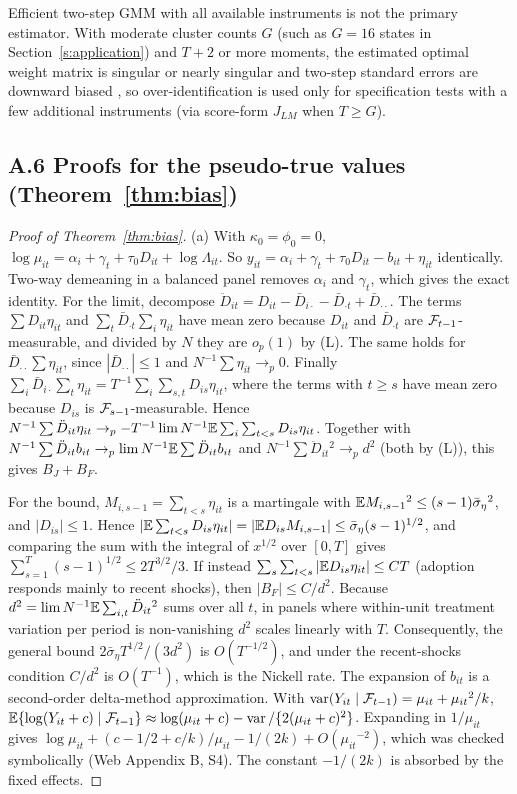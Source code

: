 Efficient two-step GMM with all available instruments is not the primary estimator. With
moderate cluster counts $G$ (such as $G=16$ states in Section~\ref{s:application}) and $T+2$ or more
moments, the estimated optimal weight matrix is singular or nearly singular and two-step standard
errors are downward biased \citep{windmeijer2005finite}, so over-identification is used only for
specification tests with a few additional instruments (via score-form $J_{LM}$ when $T\ge G$).

\subsection{A.6 Proofs for the pseudo-true values (Theorem~\ref{thm:bias})}

\begin{proof}[Proof of Theorem~\ref{thm:bias}]
(a) With $\kappa_0=\phi_0=0$, $\log\mu_{it}=\alpha_i+\gamma_t+\tau_0D_{it}+\log\Lambda_{it}$. So
$y_{it}=\alpha_i+\gamma_t+\tau_0D_{it}-b_{it}+\eta_{it}$ identically. Two-way demeaning in a balanced
panel removes $\alpha_i$ and $\gamma_t$, which gives the exact identity. For the limit, decompose
$\ddot D_{it}=D_{it}-\bar D_{i\cdot}-\bar D_{\cdot t}+\bar D_{\cdot\cdot}$. The terms
$\sum D_{it}\eta_{it}$ and $\sum_t\bar D_{\cdot t}\sum_i\eta_{it}$ have mean zero because $D_{it}$ and
$\bar D_{\cdot t}$ are $\mathcal{F}_{t-1}$-measurable, and divided by $N$ they are $o_p(1)$ by (L). The same
holds for $\bar D_{\cdot\cdot}\sum\eta_{it}$, since $|\bar D_{\cdot\cdot}|\le1$ and
$N^{-1}\sum\eta_{it}\to_p0$. Finally
$\sum_i\bar D_{i\cdot}\sum_t\eta_{it}=T^{-1}\sum_i\sum_{s,t}D_{is}\eta_{it}$, where the terms with $t\ge s$
have mean zero because $D_{is}$ is $\mathcal{F}_{s-1}$-measurable. Hence
$N^{-1}\sum\ddot D_{it}\eta_{it}\to_p-T^{-1}\lim N^{-1}\mathbb{E}\sum_i\sum_{t<s}D_{is}\eta_{it}$. Together with
$N^{-1}\sum\ddot D_{it}b_{it}\to_p\lim N^{-1}\mathbb{E}\sum\ddot D_{it}b_{it}$ and
$N^{-1}\sum\ddot D_{it}{}^2\to_pd^2$ (both by (L)), this gives $B_J+B_F$.

For the bound, $M_{i,s-1}=\sum_{t<s}\eta_{it}$ is a martingale with
$\mathbb{E} M_{i,s-1}{}^2\le(s-1)\bar\sigma_\eta{}^2$, and $|D_{is}|\le1$. Hence
$|\mathbb{E}\sum_{t<s}D_{is}\eta_{it}|=|\mathbb{E} D_{is}M_{i,s-1}|\le\bar\sigma_\eta(s-1)^{1/2}$, and
comparing the sum with the integral of $x^{1/2}$ over $[0,T]$ gives $\sum_{s=1}^T(s-1)^{1/2}\le2T^{3/2}/3$. If instead
$\sum_s\sum_{t<s}|\mathbb{E} D_{is}\eta_{it}|\le CT$ (adoption responds mainly to recent shocks), then
$|B_F|\le C/d^2$. Because $d^2=\lim N^{-1}\mathbb{E}\sum_{i,t}\ddot D_{it}{}^2$ sums over all $t$, in panels
where within-unit treatment variation per period is non-vanishing $d^2$ scales linearly with $T$.
Consequently, the general bound $2\bar\sigma_\eta T^{1/2}/(3d^2)$ is $O(T^{-1/2})$, and under the
recent-shocks condition $C/d^2$ is $O(T^{-1})$, which is the Nickell \citep{nickell1981biases} rate.
The expansion of $b_{it}$ is a second-order delta-method approximation. With
$\operatorname{var}(Y_{it}\mid\mathcal{F}_{t-1})=\mu_{it}+\mu_{it}{}^2/k$,
$\mathbb{E}\{\log(Y_{it}+c)\mid\mathcal{F}_{t-1}\}\approx\log(\mu_{it}+c)-\operatorname{var}/\{2(\mu_{it}+c)^2\}$. Expanding in
$1/\mu_{it}$ gives $\log\mu_{it}+(c-1/2+c/k)/\mu_{it}-1/(2k)+O(\mu_{it}{}^{-2})$, which was checked
symbolically (Web Appendix B, S4). The constant $-1/(2k)$ is absorbed by the fixed effects.


\end{proof}
